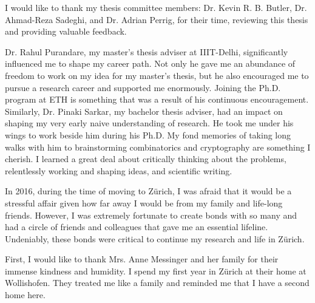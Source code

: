 I would like to thank my thesis committee members: Dr. Kevin R. B. Butler, Dr. Ahmad-Reza Sadeghi, and Dr. Adrian Perrig, for their time, reviewing this thesis and providing valuable feedback.


Dr. Rahul Purandare, my master's thesis adviser at IIIT-Delhi, significantly influenced me to shape my career path. Not only he gave me an abundance of freedom to work on my idea for my master's thesis, but he also encouraged me to pursue a research career and supported me enormously. Joining the Ph.D. program at ETH is something that was a result of his continuous encouragement. Similarly, Dr. Pinaki Sarkar, my bachelor thesis adviser, had an impact on shaping my very early naive understanding of research. He took me under his wings to work beside him during his Ph.D. My fond memories of taking long walks with him to brainstorming combinatorics and cryptography are something I cherish. I learned a great deal about critically thinking about the problems, relentlessly working and shaping ideas, and scientific writing.


In 2016, during the time of moving to Z\"urich, I was afraid that it would be a stressful affair given how far away I would be from my family and life-long friends. However, I was extremely fortunate to create bonds with so many and had a circle of friends and colleagues that gave me an essential lifeline. Undeniably, these bonds were critical to continue my research and life in Z\"urich. 


First, I would like to thank Mrs. Anne Messinger and her family for their immense kindness and humidity. I spend my first year in Z\"urich at their home at Wollishofen. They treated me like a family and reminded me that I have a second home here. 


